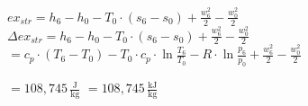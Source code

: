 \( ex_{str} = h_6 - h_0 - T_0 \cdot (s_6 - s_0) + \frac{w_6^2}{2} - \frac{w_0^2}{2} \)  
\( \Delta ex_{str} = h_6 - h_0 - T_0 \cdot (s_6 - s_0) + \frac{w_6^2}{2} - \frac{w_0^2}{2} \)  
\( = c_p \cdot (T_6 - T_0) - T_0 \cdot c_p \cdot \ln \frac{T_6}{T_0} - R \cdot \ln \frac{p_6}{p_0} + \frac{w_6^2}{2} - \frac{w_0^2}{2} \)  

\( = 108,745 \, \frac{\text{J}}{\text{kg}} \)  
\( = 108,745 \, \frac{\text{kJ}}{\text{kg}} \)